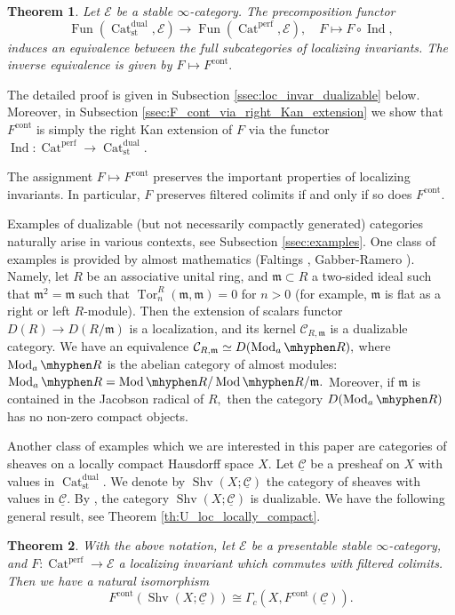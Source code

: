 \documentclass[11pt,leqno]{amsart}
\newtheorem{theo}{Theorem}[section]
\numberwithin{equation}{section}
\newcommand{\hy}{\mhyphen}
\newcommand{\Cat}{\operatorname{Cat}}
\newcommand{\cont}{\operatorname{cont}}
\newcommand{\st}{\operatorname{st}}
\newcommand{\dual}{\operatorname{dual}}
\newcommand{\cC}{{\mathcal C}}
\newcommand{\cE}{{\mathcal E}}
\newcommand{\un}{\underline}
\newcommand{\Fun}{\operatorname{Fun}}
\newcommand{\perf}{\operatorname{perf}}
\newcommand{\Sh}{\operatorname{Shv}}
\newcommand{\Shv}{\operatorname{Shv}}
\newcommand{\Tor}{\operatorname{Tor}}
\newcommand{\Ind}{\operatorname{Ind}}
\newcommand{\Mod}{\operatorname{Mod}}
\newcommand{\m}{\mathfrak{m}}
\begin{document}
\begin{theo} Let $\cE$ be a stable $\infty$-category. The precomposition functor
$$\Fun(\Cat_{\st}^{\dual},\cE)\to \Fun(\Cat^{\perf},\cE),\quad F\mapsto F\circ\Ind,$$ induces an equivalence between the full subcategories of localizing invariants. The inverse equivalence is given by $F\mapsto F^{\cont}.$\end{theo}

The detailed proof is given in Subsection \ref{ssec:loc_invar_dualizable} below. Moreover, in Subsection \ref{ssec:F_cont_via_right_Kan_extension} we show that $F^{\cont}$ is simply the right Kan extension of $F$ via the functor $\Ind:\Cat^{\perf}\to\Cat_{\st}^{\dual}.$ 

The assignment $F\mapsto F^{\cont}$ preserves the important properties of localizing invariants. In particular, $F$ preserves filtered colimits if and only if so does $F^{\cont}.$

Examples of dualizable (but not necessarily compactly generated) categories naturally arise in various contexts, see Subsection \ref{ssec:examples}. One class of examples is provided by almost mathematics (Faltings \cite{Fa02}, Gabber-Ramero \cite{GR03}). Namely, let $R$ be an associative unital ring, and $\m\subset R$ a two-sided ideal such that $\m^2=\m$ such that $\Tor_{n}^R(\m,\m)=0$ for $n>0$ (for example, $\m$ is flat as a right or left $R$-module). Then the extension of scalars functor $D(R)\to D(R/\m)$ is a localization, and its kernel $\cC_{R,\m}$ is a dualizable category. We have an equivalence $\cC_{R,\m}\simeq D(\Mod_a\mhyphen R),$ where $\Mod_a\mhyphen R$ is the abelian category of almost modules: $\Mod_a\mhyphen R=\Mod\mhyphen R/\Mod\hy R/\m.$ Moreover, if $\m$ is contained in the Jacobson radical of $R,$ then the category $D(\Mod_a\mhyphen R)$ has no non-zero compact objects.

Another class of examples which we are interested in this paper are categories of sheaves on a locally compact Hausdorff space $X.$ Let $\un{\cC}$ be a presheaf on $X$ with values in $\Cat_{\st}^{\dual}.$ We denote by $\Sh(X;\un{\cC})$ the category of sheaves with values in $\un{\cC}.$ By \cite{Lur18}, the category $\Shv(X;\un{\cC})$ is dualizable. We have the following general result, see Theorem \ref{th:U_loc_locally_compact}.

\begin{theo}\label{th:main_intro} With the above notation, let $\cE$ be a presentable stable $\infty$-category, and $F:\Cat^{\perf}\to \cE$ a localizing invariant which commutes with filtered colimits. Then we have a natural isomorphism
$$F^{\cont}(\Shv(X;\un{\cC}))\cong \Gamma_c(X,F^{\cont}(\un{\cC})).$$\end{theo}
\end{document}
